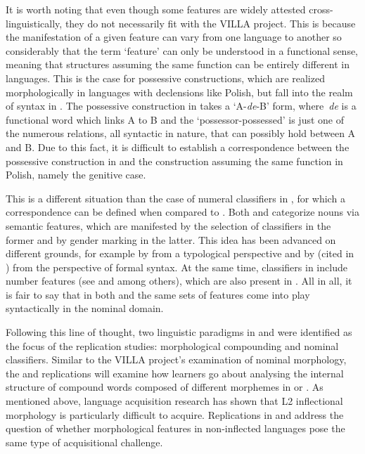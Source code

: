 \documentclass[output=paper,colorlinks,citecolor=brown,modfonts,nonflat]{../langscibook}
\begin{document}
It is worth noting that even though some features are widely attested cross-linguistically, they do not necessarily fit with the VILLA project. This is because the manifestation of a given feature can vary from one language to another so considerably that the term ‘feature’ can only be understood in a functional sense, meaning that structures assuming the same function can be entirely different in languages. This is the case for possessive constructions, which are realized morphologically in languages with declensions like Polish, but fall into the realm of syntax in . The possessive construction in  takes a ‘A-\textit{de}{}-B’ form, where~\textit{de} is a functional word which links A to B and the ‘possessor-possessed’ is just one of the numerous relations, all syntactic in nature, that can possibly hold between A and B. Due to this fact, it is difficult to establish a correspondence between the possessive construction in  and the construction assuming the same function in Polish, namely the genitive case.



{This is a different situation than the case of numeral classifiers in , for which a correspondence can be defined when compared to . Both  and  categorize nouns via semantic features, which are manifested by the selection of classifiers in the former and by gender marking in the latter. This idea has been advanced on different grounds, for example by \citet{Aikhenvald2000} from a typological perspective and by \citet{Picallo2008} (cited in \citealt{Rouveret2016}) from the perspective of formal syntax. At the same time, classifiers in  include number features (see \citealt{ChengSybesma1998} and \citealt{Li1999} among others), which are also present in . All in all, it is fair to say that in both  and  the same sets of features come into play syntactically in the nominal domain.~}


Following this line of thought, two linguistic paradigms in  and  were identified as the focus of the replication studies: morphological compounding and nominal classifiers. Similar to the VILLA project’s examination of nominal morphology, the  and  replications will examine how learners go about analysing the internal structure of compound words composed of different morphemes in  or . As mentioned above, language acquisition research has shown that L2 inflectional morphology is particularly difficult to acquire. Replications in  and  address the question of whether morphological features in non-inflected languages pose the same type of acquisitional challenge.
\end{document}
